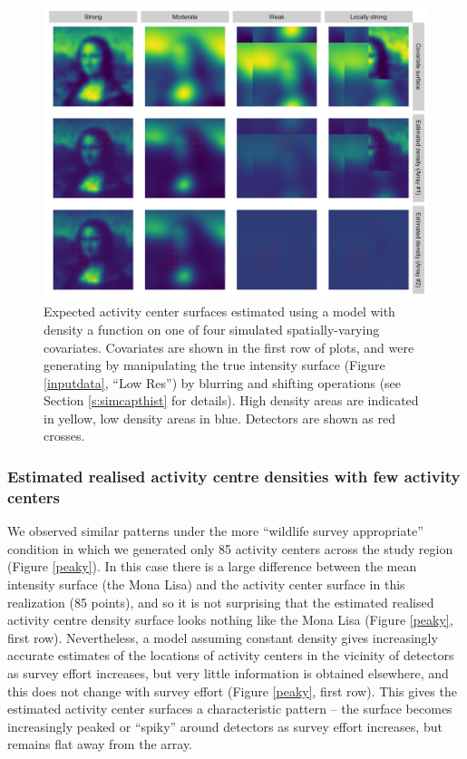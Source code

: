 \documentclass[a4paper,12pt]{article}
\begin{document}
\begin{figure}[htbp]
\centering
\includegraphics[width=1\textwidth]{mona_covariates.png}
\caption{Expected activity center surfaces estimated using a model with density a function on one of four simulated spatially-varying covariates. Covariates are shown in the first row of plots, and were generating by manipulating the true intensity surface (Figure \ref{inputdata}, ``Low Res'') by blurring and shifting operations (see Section \ref{s:simcapthist} for details). High density areas are indicated in yellow, low density areas in blue. Detectors are shown as red crosses.} 
\label{covariates}
\end{figure}

\subsubsection{Estimated realised activity centre densities with few activity centers}

We observed similar patterns under the more ``wildlife survey appropriate'' condition in which we generated only 85 activity centers across the study region (Figure \ref{peaky}). In this case there is a large difference between the mean intensity surface (the Mona Lisa) and the activity center surface in this realization (85 points), and so it is not surprising that the estimated realised activity centre density surface looks nothing like the Mona Lisa (Figure \ref{peaky}, first row). Nevertheless, a model assuming constant density gives increasingly accurate estimates of the locations of activity centers in the vicinity of detectors as survey effort increases, but very little information is obtained elsewhere, and this does not change with survey effort (Figure \ref{peaky}, first row). This gives the estimated activity center surfaces a characteristic pattern -- the surface becomes increasingly peaked or ``spiky'' around detectors as survey effort increases, but remains flat away from the array. 
\end{document}
